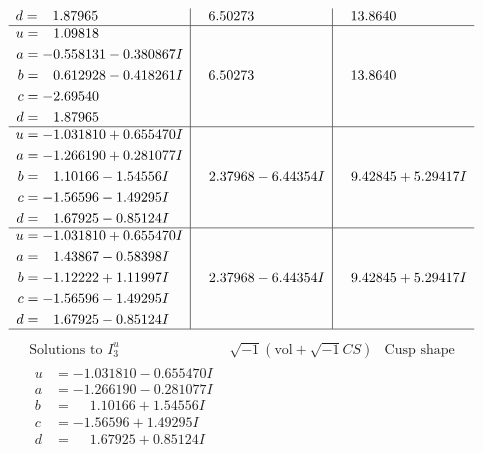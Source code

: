 \documentclass[1p]{elsarticle_modified}
\theoremstyle{definition}
\newcommand{\I}{\sqrt{-1}}
\begin{document}
$$\begin{array}{c|c|c}
\begin{aligned}
d &= \phantom{-}1.87965\phantom{ +0.000000I}\end{aligned}
 & \phantom{-}6.50273\phantom{ +0.000000I} & \phantom{-}13.8640\phantom{ +0.000000I} \\ \hline\begin{aligned}
u &= \phantom{-}1.09818\phantom{ +0.000000I} \\
a &= -0.558131 - 0.380867 I \\
b &= \phantom{-}0.612928 - 0.418261 I \\
c &= -2.69540\phantom{ +0.000000I} \\
d &= \phantom{-}1.87965\phantom{ +0.000000I}\end{aligned}
 & \phantom{-}6.50273\phantom{ +0.000000I} & \phantom{-}13.8640\phantom{ +0.000000I} \\ \hline\begin{aligned}
u &= -1.031810 + 0.655470 I \\
a &= -1.266190 + 0.281077 I \\
b &= \phantom{-}1.10166 - 1.54556 I \\
c &= -1.56596 - 1.49295 I \\
d &= \phantom{-}1.67925 - 0.85124 I\end{aligned}
 & \phantom{-}2.37968 - 6.44354 I & \phantom{-}9.42845 + 5.29417 I \\ \hline\begin{aligned}
u &= -1.031810 + 0.655470 I \\
a &= \phantom{-}1.43867 - 0.58398 I \\
b &= -1.12222 + 1.11997 I \\
c &= -1.56596 - 1.49295 I \\
d &= \phantom{-}1.67925 - 0.85124 I\end{aligned}
 & \phantom{-}2.37968 - 6.44354 I & \phantom{-}9.42845 + 5.29417 I\\
 \hline 
 \end{array}$$\newpage$$\begin{array}{c|c|c}  
\text{Solutions to }I^u_{3}& \I (\text{vol} + \sqrt{-1}CS) & \text{Cusp shape}\\
 \hline 
\begin{aligned}
u &= -1.031810 - 0.655470 I \\
a &= -1.266190 - 0.281077 I \\
b &= \phantom{-}1.10166 + 1.54556 I \\
c &= -1.56596 + 1.49295 I \\
d &= \phantom{-}1.67925 + 0.85124 I\end{aligned}

\end{array}$$
\end{document}
